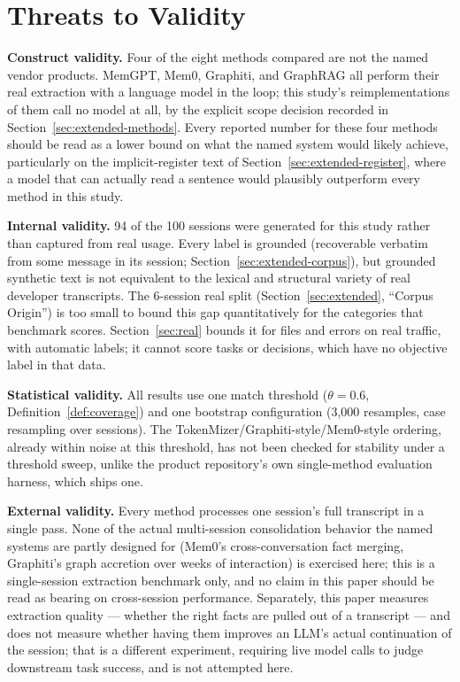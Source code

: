 \documentclass[journal]{IEEEtran}
\begin{document}
\section{Threats to Validity}
\label{sec:threats}

\textbf{Construct validity.} Four of the eight methods compared
are not the named vendor products.
MemGPT, Mem0, Graphiti, and GraphRAG all perform their real
extraction with a language model in the loop; this study's
reimplementations of them call no model at all, by the explicit
scope decision recorded in Section~\ref{sec:extended-methods}.
Every reported number for these four methods should be read as
a lower bound on what the named system would likely achieve,
particularly on the implicit-register text of
Section~\ref{sec:extended-register}, where a model that can
actually read a sentence would plausibly outperform every
method in this study.

\textbf{Internal validity.} 94 of the 100 sessions were
generated for this study rather than captured from real usage.
Every label is grounded (recoverable verbatim from some message
in its session; Section~\ref{sec:extended-corpus}), but grounded
synthetic text is not equivalent to the lexical and structural
variety of real developer transcripts. The 6-session real split
(Section~\ref{sec:extended}, ``Corpus Origin'') is too small
to bound this gap quantitatively for the categories that
benchmark scores. Section~\ref{sec:real} bounds it for files and
errors on real traffic, with automatic labels; it cannot score
tasks or decisions, which have no objective label in that data.

\textbf{Statistical validity.} All results use one match
threshold ($\theta=0.6$, Definition~\ref{def:coverage}) and one
bootstrap configuration (3{,}000 resamples, case resampling over
sessions). The TokenMizer/Graphiti-style/Mem0-style ordering,
already within noise at this threshold, has not been checked
for stability under a threshold sweep, unlike the product
repository's own single-method evaluation harness, which ships
one.

\textbf{External validity.} Every method processes one
session's full transcript in a single pass. None of the actual
multi-session consolidation behavior the named systems are
partly designed for (Mem0's cross-conversation fact merging,
Graphiti's graph accretion over weeks of interaction) is
exercised here; this is a single-session extraction benchmark
only, and no claim in this paper should be read as bearing on
cross-session performance. Separately, this paper measures
extraction quality --- whether the right facts are pulled out
of a transcript --- and does not measure whether having them
improves an LLM's actual continuation of the session; that is a
different experiment, requiring live model calls to judge
downstream task success, and is not attempted here.
\end{document}
